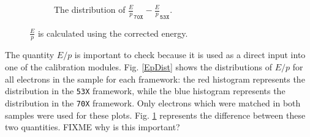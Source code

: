 \documentclass[10pt]{article}
\begin{document}
\begin{figure}[h!]
\begin{subfigure}[b]{0.4\textwidth}
                \caption{The distribution of $\frac{E}{p}_\texttt{70X} -\frac{E}{p}_\texttt{53X}$.}
                \label{EpDiff}
        \end{subfigure}
  \label{EpValidation}
        \caption{$\frac{E}{p}$ is calculated using the corrected energy.}
\end{figure}

The quantity $E/p$ is important to check because it is used as a direct input into one of the calibration modules. Fig. \ref{EpDist} shows the distributions of $E/p$ for all electrons in the sample for each framework: the red histogram represents the distribution in the \texttt{53X} framework, while the blue histogram represents the distribution in the \texttt{70X} framework. Only electrons which were matched in both samples were used for these plots. Fig. \ref{EpDiff} represents the difference between these two quantities. FIXME why is this important?
\end{document}
